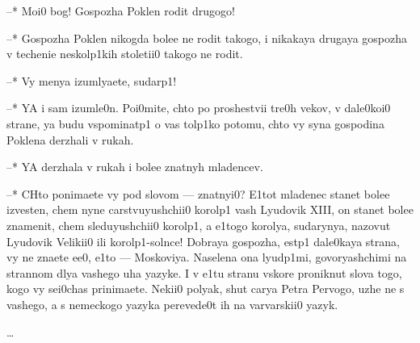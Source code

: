 \documentclass[russian,english]{book}
\begin{document}
\cdash--* Moi0 bog! Gospozha Poklen rodit drugogo!

\cdash--* Gospozha Poklen nikogda bolee ne rodit takogo, i nikakaya drugaya gospozha v techenie neskolp1kih stoletii0 takogo ne rodit.

\cdash--* Vy menya izumlyaete, sudarp1!

\cdash--* YA i sam izumle0n. Poi0mite, chto po proshestvii tre0h vekov, v dale0koi0 strane, ya budu vspominatp1 o vas tolp1ko potomu, chto vy syna gospodina Poklena derzhali v rukah.

\cdash--* YA derzhala v rukah i bolee znatnyh mladencev.

\cdash--* CHto ponimaete vy pod slovom \cdash--- znatnyi0? E1tot mladenec stanet bolee izvesten, chem nyne carstvuyushchii0 korolp1 vash Lyudovik {XIII}, on stanet bolee znamenit, chem sleduyushchii0 korolp1, a e1togo korolya, sudarynya, nazovut Lyudovik Velikii0 ili korolp1-solnce! Dobraya gospozha, estp1 dale0kaya strana, vy ne znaete ee0, e1to \cdash--- Moskoviya. Naselena ona lyudp1mi, govoryashchimi na strannom dlya vashego uha yazyke. I v e1tu stranu vskore proniknut slova togo, kogo vy sei0chas prinimaete. Nekii0 polyak, shut carya Petra Pervogo, uzhe ne s vashego, a s nemeckogo yazyka perevede0t ih na varvarskii0 yazyk.

\ldots

\end{document}
